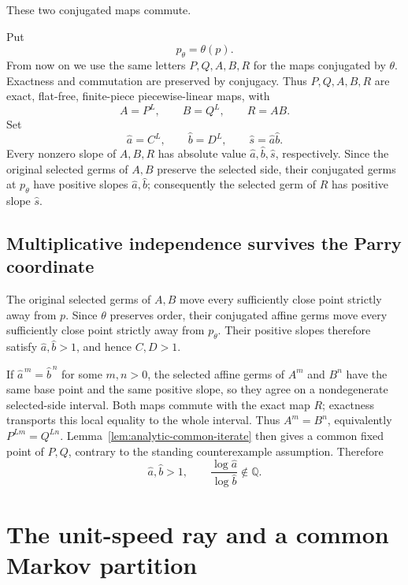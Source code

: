 \documentclass[11pt]{article}
\theoremstyle{definition}
\theoremstyle{remark}
\begin{document}
These two conjugated maps commute.

Put
\[
 p_\theta=\theta(p).
\]
From now on we use the same letters \(P,Q,A,B,R\) for the maps conjugated by
\(\theta\).  Exactness and commutation are preserved by conjugacy.  Thus
\(P,Q,A,B,R\) are exact, flat-free, finite-piece piecewise-linear maps, with
\[
 A=P^L,\qquad B=Q^L,\qquad R=AB.
\]
Set
\begin{equation}\label{term:eq:transformed-scales}
 \widehat a=C^L,\qquad
 \widehat b=D^L,\qquad
 \widehat s=\widehat a\widehat b.
\end{equation}
Every nonzero slope of \(A,B,R\) has absolute value
\(\widehat a,\widehat b,\widehat s\), respectively.  Since the original
selected germs of \(A,B\) preserve the selected side, their conjugated germs
at \(p_\theta\) have positive slopes \(\widehat a,\widehat b\); consequently
the selected germ of \(R\) has positive slope \(\widehat s\).

\subsection{Multiplicative independence survives the Parry coordinate}

The original selected germs of \(A,B\) move every sufficiently close point
strictly away from \(p\).  Since \(\theta\) preserves order, their conjugated
affine germs move every sufficiently close point strictly away from
\(p_\theta\).  Their positive slopes therefore satisfy
\(\widehat a,\widehat b>1\), and hence \(C,D>1\).

If \(\widehat a^{\,m}=\widehat b^{\,n}\) for some \(m,n>0\), the selected
affine germs of \(A^m\) and \(B^n\) have the same base point and the same
positive slope, so they agree on a nondegenerate selected-side interval.
Both maps commute with the exact map \(R\); exactness transports this local
equality to the whole interval.  Thus \(A^m=B^n\), equivalently
\(P^{Lm}=Q^{Ln}\).  Lemma~\ref{lem:analytic-common-iterate} then gives a
common fixed point of \(P,Q\), contrary to the standing counterexample
assumption.  Therefore
\begin{equation}\label{term:eq:new-independent}
 \widehat a,\widehat b>1,\qquad
 \frac{\log\widehat a}{\log\widehat b}\notin\mathbb Q.
\end{equation}

\section{The unit-speed ray and a common Markov partition}
\end{document}
